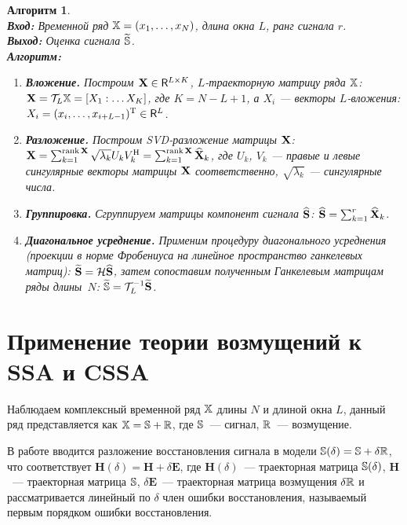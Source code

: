 \documentclass{spisok-article}
\newtheorem{algorithm}{Алгоритм}%
\begin{document}
\begin{algorithm}
\label{alg:ssa}
~\\
\textbf{Вход:} Временной ряд $\mathbb{X} = (x_1, \dots, x_N)$, \emph{длина окна} $L$,
    ранг сигнала $r$.\\
\textbf{Выход:} Оценка сигнала $\widetilde{\mathbb{S}}$.\\
\textbf{Алгоритм:}
\begin{enumerate}
    \item \textbf{Вложение.}
        \label{item:embedding}
        Построим $\mathbf{X} \in \mathsf{R}^{L \times K}$, \emph{$L$-траекторную матрицу} ряда $\mathbb{X}$:
        $\mathbf{X} = \mathcal{T}_L \mathbb{X} = [X_1 : \dots X_K]$,
        где $K = N - L + 1$,
        а $X_i$ --- \emph{векторы $L$-вложения:}
        $X_i = (x_i, \dots, x_{i+L-1})^\mathrm{T} \in \mathsf{R}^L$.
    \item \textbf{Разложение.}
        \label{item:decomposition}
        Построим SVD-разложение матрицы $\mathbf{X}$:
        $\mathbf{X} =
        \sum_{k=1}^{\mathop{\mathrm{rank}} \mathbf{X}} \sqrt{\lambda_k} U_k V_k^\mathrm{H} = \sum_{k=1}^{\mathop{\mathrm{rank}} \mathbf{X}} \widehat{\mathbf{X}}_k$,
        где $U_k$, $V_k$ --- правые и левые сингулярные векторы матрицы $\mathbf{X}$ соответственно,
        $\sqrt{\lambda_k}$ --- сингулярные числа.
    \item \textbf{Группировка.} Сгруппируем матрицы компонент сигнала $\widehat{\mathbf{S}}$:
        $\widehat{\mathbf{S}} = \sum_{k=1}^r \widehat{\mathbf{X}}_k$.
    \item \textbf{Диагональное усреднение.}
        \label{item:reconstruction}
        Применим процедуру диагонального усреднения (проекции в норме Фробениуса
        на линейное пространство ганкелевых матриц):
        $\widetilde{\mathbf{S}} = \mathcal{H} \widehat{\mathbf{S}}$,
        затем сопоставим полученным Ганкелевым матрицам ряды длины~$N$:
        $\widetilde{\mathbb{S}} = \mathcal{T}_L^{-1} \widetilde{\mathbf{S}}$.
\end{enumerate}
\end{algorithm}


\section{Применение теории возмущений к SSA и CSSA}

Наблюдаем комплексный временной ряд $\mathbb{X}$ длины $N$ и длиной окна $L$, данный ряд представляется как $\mathbb{X} = \mathbb{S} + \mathbb{R}$, где $\mathbb{S}$~--- сигнал, $\mathbb{R}$~--- возмущение.

В работе \cite{Nekrutkin} вводится разложение восстановления сигнала в модели $\mathbb{S}(\delta) = \mathbb{S} + \delta \mathbb{R}$, что соответствует $\mathbf{H}(\delta) = \mathbf{H} + \delta \mathbf{E}$, где $\mathbf{H}(\delta)$~--- траекторная матрица $\mathbb{S}(\delta)$, $\mathbf{H}$~--- траекторная матрица $\mathbb{S}$, $\delta\mathbf{E}$~--- траекторная матрица возмущения $\delta \mathbb{R}$ и рассматривается линейный по $\delta$ член ошибки восстановления, называемый первым порядком ошибки восстановления. 
\end{document}
